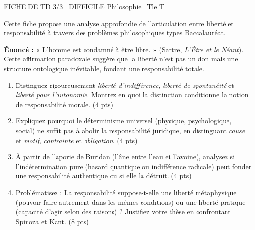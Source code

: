 \documentclass[11pt]{article}
\begin{document}
\begin{tcolorbox}[enhanced,colback=popink,colframe=popink,arc=10pt,boxrule=0pt,left=12pt,right=12pt,top=9pt,bottom=9pt]
{\color{white}\popxbold\small FICHE DE TD 3/3 \textbullet\ DIFFICILE \hfill Philosophie \textbullet\ Tle T\par}
\end{tcolorbox}
\vspace{4pt}
Cette fiche propose une analyse approfondie de l'articulation entre liberté et responsabilité à travers des problèmes philosophiques types Baccalauréat.

\begin{exercice}
\textbf{Énoncé :} « L'homme est condamné à être libre. » (Sartre, \textit{L'Être et le Néant}). Cette affirmation paradoxale suggère que la liberté n'est pas un don mais une structure ontologique inévitable, fondant une responsabilité totale.
\begin{enumerate}
    \item Distinguez rigoureusement \textit{liberté d'indifférence}, \textit{liberté de spontanéité} et \textit{liberté pour l'autonomie}. Montrez en quoi la distinction conditionne la notion de responsabilité morale. (4 pts)
    \item Expliquez pourquoi le déterminisme universel (physique, psychologique, social) ne suffit pas à abolir la responsabilité juridique, en distinguant \textit{cause} et \textit{motif}, \textit{contrainte} et \textit{obligation}. (4 pts)
    \item À partir de l'aporie de Buridan (l'âne entre l'eau et l'avoine), analysez si l'indétermination pure (hasard quantique ou indifférence radicale) peut fonder une responsabilité authentique ou si elle la détruit. (4 pts)
    \item Problématisez : La responsabilité suppose-t-elle une liberté métaphysique (pouvoir faire autrement dans les mêmes conditions) ou une liberté pratique (capacité d'agir selon des raisons) ? Justifiez votre thèse en confrontant Spinoza et Kant. (8 pts)
\end{enumerate}
\end{exercice}
\end{document}
